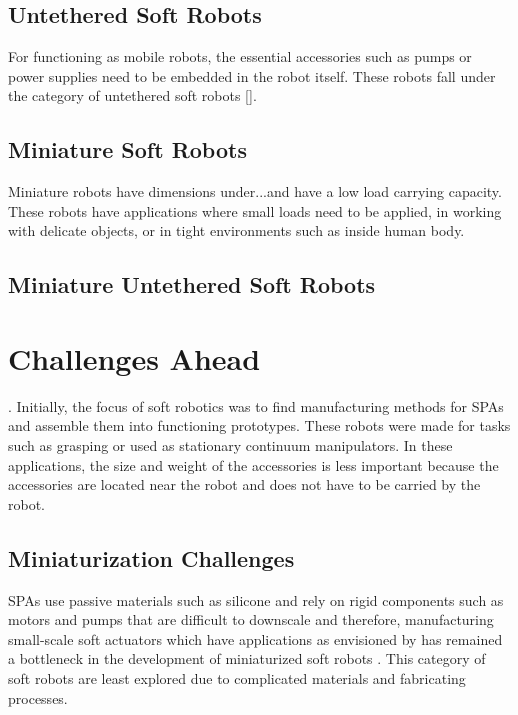 \subsection{Untethered Soft Robots}
For functioning as mobile robots, the essential accessories such as pumps or power supplies need to be embedded in the robot itself. These robots fall under the category of untethered soft robots [].  
\subsection{Miniature Soft Robots}
Miniature robots have dimensions under...and have a low load carrying capacity. These robots have applications where small loads need to be applied, in working with delicate objects, or in tight environments such as inside human body. 
\subsection{Miniature Untethered Soft Robots}

\section{Challenges Ahead}.
Initially, the focus of soft robotics was to find manufacturing methods for SPAs and assemble them into functioning prototypes. These robots were made for tasks such as grasping or used as stationary continuum manipulators. In these applications, the size and weight of the accessories is less important because the accessories are located near the robot and does not have to be carried by the robot. 
\subsection{Miniaturization Challenges}
SPAs use passive materials such as silicone and rely on rigid components such as motors and pumps that are difficult to downscale and therefore, manufacturing small-scale soft actuators which have applications as envisioned by \cite{hines2017} has remained a bottleneck in the development of miniaturized soft robots \cite{majidi2019}. This category of soft robots are least explored due to complicated materials and fabricating processes.  
